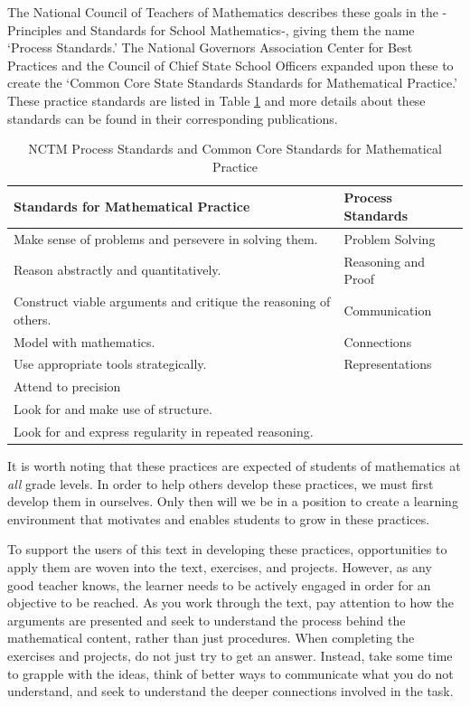 \documentclass[
]{book}
\theoremstyle{definition}
\theoremstyle{definition}
\theoremstyle{definition}
\theoremstyle{definition}
\theoremstyle{remark}
\begin{document}
The National Council of Teachers of Mathematics \citeyearpar{PSSM} describes these goals in the -Principles and Standards for School Mathematics-, giving them the name `Process Standards.' The National Governors Association Center for Best Practices and the Council of Chief State School Officers \citep{CCSS} expanded upon these to create the `Common Core State Standards Standards for Mathematical Practice.' These practice standards are listed in Table \ref{tab:SMPs} and more details about these standards can be found in their corresponding publications.

\begin{table}

\caption{\label{tab:SMPs}NCTM Process Standards and  Common Core Standards for Mathematical Practice}
\centering
\begin{tabular}[t]{l|l}
\hline
Standards for Mathematical Practice & Process Standards\\
\hline
Make sense of problems and persevere in solving them. & Problem Solving\\
\hline
Reason abstractly and quantitatively. & Reasoning and Proof\\
\hline
Construct viable arguments and critique the reasoning of others. & Communication\\
\hline
Model with mathematics. & Connections\\
\hline
Use appropriate tools strategically. & Representations\\
\hline
Attend to precision & \\
\hline
Look for and make use of structure. & \\
\hline
Look for and express regularity in repeated reasoning. & \\
\hline
\end{tabular}
\end{table}

It is worth noting that these practices are expected of students of mathematics at \emph{all} grade levels. In order to help others develop these practices, we must first develop them in ourselves. Only then will we be in a position to create a learning environment that motivates and enables students to grow in these practices.

To support the users of this text in developing these practices, opportunities to apply them are woven into the text, exercises, and projects. However, as any good teacher knows, the learner needs to be actively engaged in order for an objective to be reached. As you work through the text, pay attention to how the arguments are presented and seek to understand the process behind the mathematical content, rather than just procedures. When completing the exercises and projects, do not just try to get an answer. Instead, take some time to grapple with the ideas, think of better ways to communicate what you do not understand, and seek to understand the deeper connections involved in the task.
\end{document}
